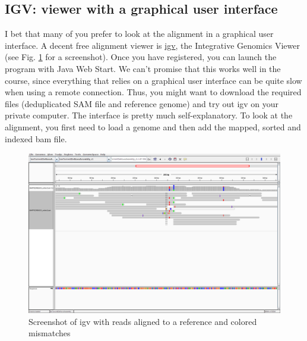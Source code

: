\documentclass[11pt]{article}
\begin{document}
\subsection{IGV: viewer with a graphical user interface}
\label{sec:orgheadline9}
I bet that many of you prefer to look at the alignment in a graphical
user interface. A decent free alignment viewer is \href{https://www.broadinstitute.org/igv/}{igv}, the Integrative
Genomics Viewer (see Fig. \ref{fig:orgparagraph2} for a screenshot). Once you have
registered, you can launch the program with Java Web Start. We can't
promise that this works well in the course, since everything that
relies on a graphical user interface can be quite slow when using a
remote connection. Thus, you might want to download the required files
(deduplicated SAM file and reference genome) and try out igv on your
private computer. The interface is pretty much self-explanatory. To
look at the alignment, you first need to load a genome and then add
the mapped, sorted and indexed bam file.



\begin{figure}[htb]
\centering
\includegraphics[width=17cm]{igv.png}
\caption{\label{fig:orgparagraph2}
Screenshot of igv with reads aligned to a reference and colored mismatches}
\end{figure}

\clearpage
\end{document}
